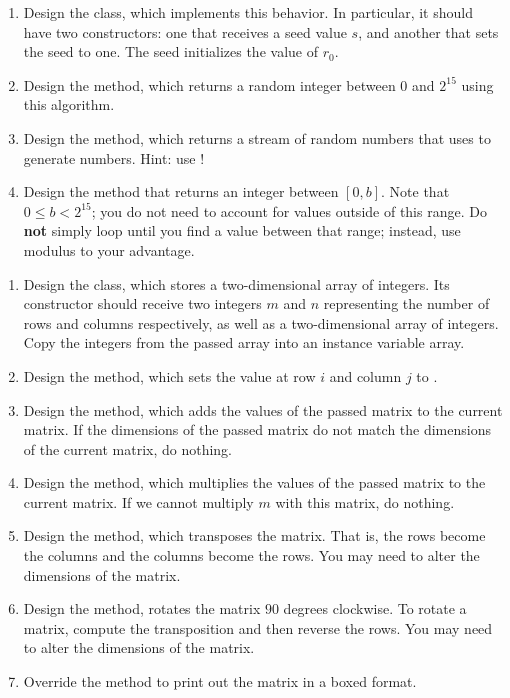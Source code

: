 \begin{enumerate}[label=(\alph*)]
    \item Design the  class, which implements this behavior. In particular, it should have two constructors: one that receives a seed value $s$, and another that sets the seed to one. The seed initializes the value of $r_0$.
    \item Design the  method, which returns a random integer between $0$ and $2^{15}$ using this algorithm.
    \item Design the  method, which returns a stream of random numbers that uses  to generate numbers. Hint: use !
    \item Design the  method that returns an integer between $[0, b]$. Note that $0 \leq b < 2^{15}$; you do not need to account for values outside of this range. Do \textbf{not} simply loop until you find a value between that range; instead, use modulus to your advantage.
\end{enumerate}


\begin{enumerate}[label=(\alph*)]
    \item Design the  class, which stores a two-dimensional array of integers. Its constructor should receive two integers $m$ and $n$ representing the number of rows and columns respectively, as well as a two-dimensional array of integers. Copy the integers from the passed array into an instance variable array.
    \item Design the  method, which sets the value at row $i$ and column $j$ to .
    \item Design the  method, which adds the values of the passed matrix to the current matrix. If the dimensions of the passed matrix do not match the dimensions of the current matrix, do nothing.
    \item Design the  method, which multiplies the values of the passed matrix to the current matrix. If we cannot multiply $m$ with this matrix, do nothing.
    \item Design the  method, which transposes the matrix. That is, the rows become the columns and the columns become the rows. You may need to alter the dimensions of the matrix.
    \item Design the  method, rotates the matrix $90$ degrees clockwise. To rotate a matrix, compute the transposition and then reverse the rows. You may need to alter the dimensions of the matrix.
    \item Override the  method to print out the matrix in a boxed format.
\end{enumerate}

